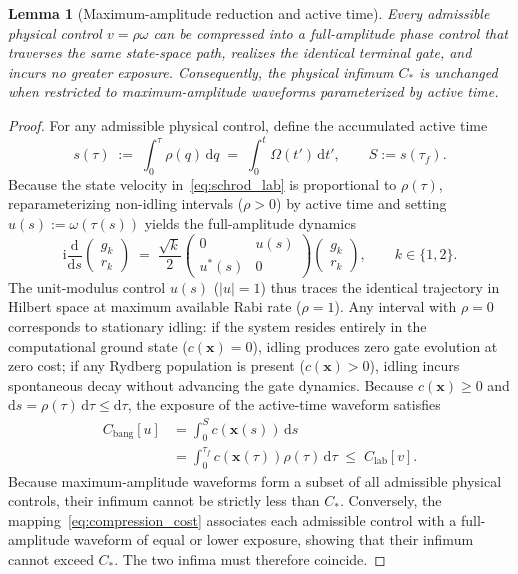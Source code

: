 \documentclass[aps,prx,reprint,nofootinbib,longbibliography,floatfix]{revtex4-2}
\newtheorem{lemma}{Lemma}
\theoremstyle{plain}
\theoremstyle{remark}
\newcommand{\dd}{\mathrm{d}}
\newcommand{\ii}{\mathrm{i}}
\newcommand{\xv}{\boldsymbol{x}}
\begin{document}
\begin{lemma}[Maximum-amplitude reduction and active time]
\label{lem:bang}
Every admissible physical control $v = \rho\omega$ can be compressed into a full-amplitude phase control that traverses the same state-space path, realizes the identical terminal gate, and incurs no greater exposure. Consequently, the physical infimum $C_*$ is unchanged when restricted to maximum-amplitude waveforms parameterized by active time.
\end{lemma}
\begin{proof}
For any admissible physical control, define the accumulated active time
\begin{equation}
s(\tau) \;:=\; \int_0^\tau \rho(q)\,\dd q
\;=\; \int_0^t \Omega(t')\,\dd t',
\qquad S:=s(\tau_f).
\label{eq:active_time}
\end{equation}
Because the state velocity in~\eqref{eq:schrod_lab} is proportional to $\rho(\tau)$, reparameterizing non-idling intervals ($\rho > 0$) by active time and setting $u(s) := \omega(\tau(s))$ yields the full-amplitude dynamics
\begin{equation}
\ii \frac{\dd}{\dd s}\begin{pmatrix}g_k\\r_k\end{pmatrix}
\;=\; \frac{\sqrt{k}}{2}
\begin{pmatrix}0&u(s)\\u^*(s)&0\end{pmatrix}
\begin{pmatrix}g_k\\r_k\end{pmatrix},
\qquad k \in \{1, 2\}.
\label{eq:schrod}
\end{equation}
The unit-modulus control $u(s)$ ($|u|=1$) thus traces the identical trajectory in Hilbert space at maximum available Rabi rate ($\rho = 1$). Any interval with $\rho = 0$ corresponds to stationary idling: if the system resides entirely in the computational ground state ($c(\xv)=0$), idling produces zero gate evolution at zero cost; if any Rydberg population is present ($c(\xv)>0$), idling incurs spontaneous decay without advancing the gate dynamics. Because $c(\xv) \ge 0$ and $\dd s = \rho(\tau)\,\dd\tau \le \dd\tau$, the exposure of the active-time waveform satisfies
\begin{equation}
\begin{split}
C_{\mathrm{bang}}[u] &= \int_0^S c(\xv(s))\,\dd s \\
&= \int_0^{\tau_f} c(\xv(\tau))\rho(\tau)\,\dd\tau \;\le\; C_{\mathrm{lab}}[v].
\end{split}
\label{eq:compression_cost}
\end{equation}
Because maximum-amplitude waveforms form a subset of all admissible physical controls, their infimum cannot be strictly less than $C_*$. Conversely, the mapping~\eqref{eq:compression_cost} associates each admissible control with a full-amplitude waveform of equal or lower exposure, showing that their infimum cannot exceed $C_*$. The two infima must therefore coincide.
\end{proof}
\end{document}
